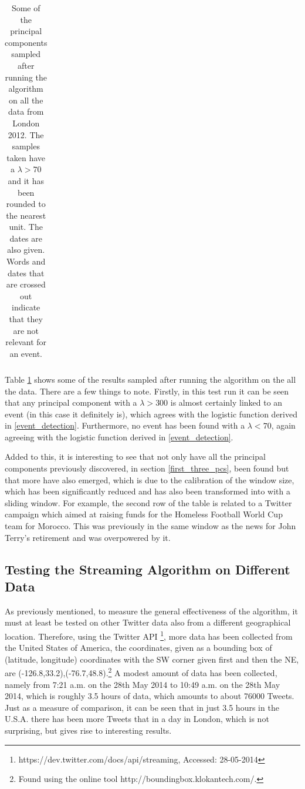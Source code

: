 \documentclass[11pt,a4paper]{article}
\begin{document}
\begin{table}[H]
\begin{tabular}{| p{11cm}| r | l|}
\hline
\end{tabular}
\caption{Some of the principal components sampled after running the algorithm on all the data from London 2012. The samples taken have a $\lambda > 70$ and it has been rounded to the nearest unit. The dates are also given. Words and dates that are crossed out indicate that they are not relevant for an event.}
\label{streaming_test}
\end{table}

Table \ref{streaming_test} shows some of the results sampled after running the algorithm on the all the data. There are a few things to note. Firstly, in this test run it can be seen that any principal component with a $\lambda > 300$ is almost certainly linked to an event (in this case it definitely is), which agrees with the logistic function derived in \ref{event_detection}. Furthermore, no event has been found with a $\lambda < 70$, again agreeing with the logistic function derived in \ref{event_detection}. 

Added to this, it is interesting to see that not only have all the principal components previously discovered, in section \ref{first_three_pcs}, been found but that more have also emerged, which is due to the calibration of the window size, which has been significantly reduced and has also been transformed into with a sliding window. For example, the second row of the table is related to a Twitter campaign which aimed at raising funds for the Homeless Football World Cup team for Morocco. This was previously in the same window as the news for John Terry's retirement and was overpowered by it.

\subsection{Testing the Streaming Algorithm on Different Data}
As previously mentioned, to measure the general effectiveness of the algorithm, it must at least be tested on other Twitter data also from a different geographical location. Therefore, using the Twitter API \footnote{https://dev.twitter.com/docs/api/streaming, Accessed: 28-05-2014}, more data has been collected from the United States of America, the coordinates, given as a bounding box of (latitude, longitude) coordinates with the SW corner given first and then the NE, are (-126.8,33.2),(-76.7,48.8).\footnote{Found using the online tool http://boundingbox.klokantech.com/.} A modest amount of data has been collected, namely from 7:21 a.m. on the 28th May 2014 to 10:49 a.m. on the 28th May 2014, which is roughly 3.5 hours of data, which amounts to about 76000 Tweets. Just as a measure of comparison, it can be seen that in just 3.5 hours in the U.S.A. there has been more Tweets that in a day in London, which is not surprising, but gives rise to interesting results. 
\end{document}
